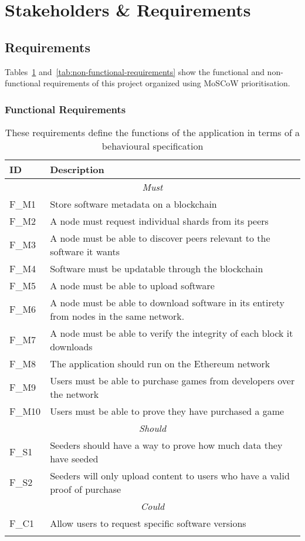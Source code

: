 
\section{Stakeholders \& Requirements}



\subsection{Requirements}
\label{subsec:requirements}


Tables~\ref{tab:functional-requirements} and~\ref{tab:non-functional-requirements} show the functional and non-functional requirements of this project organized using MoSCoW prioritisation. 

\subsubsection*{Functional Requirements}

\begin{longtable}{ p{} p{} }
  \toprule
  \textbf{ID} & \textbf{Description}
  \\\midrule\midrule
  \multicolumn{2}{c}{\cellcolor{red!70}\textit{Must}}\\\midrule
  F\_M1 & Store software metadata on a blockchain\\
  F\_M2 & A node must request individual shards from its peers\\
  F\_M3 & A node must be able to discover peers relevant to the software it wants\\
  F\_M4 & Software must be updatable through the blockchain\\
  F\_M5 & A node must be able to upload software\\
  F\_M6 & A node must be able to download software in its entirety from nodes in the same network.\\
  F\_M7 & A node must be able to verify the integrity of each block it downloads\\
  F\_M8 & The application should run on the Ethereum network\\
  F\_M9 & Users must be able to purchase games from developers over the network\\
  F\_M10 & Users must be able to prove they have purchased a game\\
  \midrule\multicolumn{2}{c}{\cellcolor{orange!70}\textit{Should}}\\\midrule
  F\_S1 & Seeders should have a way to prove how much data they have seeded\\
  F\_S2 & Seeders will only upload content to users who have a valid proof of purchase\\
  \midrule\multicolumn{2}{c}{\cellcolor{green}\textit{Could}}\\\midrule
  F\_C1 & Allow users to request specific software versions\\
  \midrule
  \bottomrule
  \caption{These requirements define the functions of the application in terms of a behavioural specification }
  \label{tab:functional-requirements}
\end{longtable}

